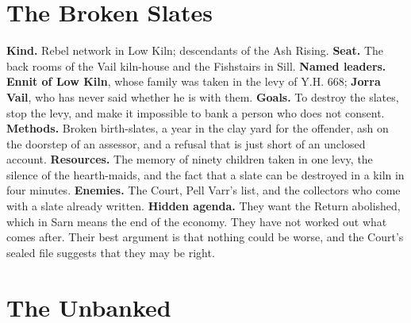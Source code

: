 \documentclass{design/chronicle}
\begin{document}
\section*{The Broken Slates}

\textbf{Kind.} Rebel network in Low Kiln; descendants of the Ash Rising. \textbf{Seat.} The back rooms of the Vail kiln-house and the Fishstairs in Sill. \textbf{Named leaders.} \textbf{Ennit of Low Kiln}, whose family was taken in the levy of Y.H. 668; \textbf{Jorra Vail}, who has never said whether he is with them. \textbf{Goals.} To destroy the slates, stop the levy, and make it impossible to bank a person who does not consent. \textbf{Methods.} Broken birth-slates, a year in the clay yard for the offender, ash on the doorstep of an assessor, and a refusal that is just short of an unclosed account. \textbf{Resources.} The memory of ninety children taken in one levy, the silence of the hearth-maids, and the fact that a slate can be destroyed in a kiln in four minutes. \textbf{Enemies.} The Court, Pell Varr’s list, and the collectors who come with a slate already written. \textbf{Hidden agenda.} They want the Return abolished, which in Sarn means the end of the economy. They have not worked out what comes after. Their best argument is that nothing could be worse, and the Court’s sealed file suggests that they may be right.

\section*{The Unbanked}
\end{document}
